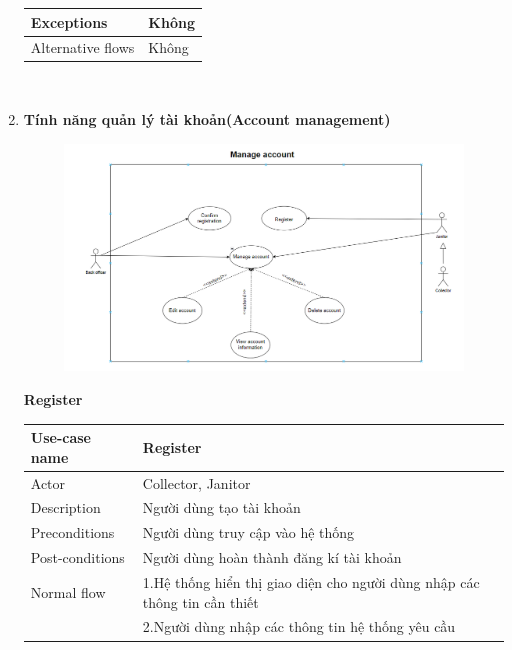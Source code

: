\documentclass[a4paper]{article}
\begin{document}
\begin{enumerate}
\begin{tabular}{| p{3cm} | p{10cm} |}
      \hline
     Exceptions & Không 
     \\ \hline
     Alternative flows & Không
     \\ \hline
\end{tabular}\\
\vspace{0.5cm}


 






\item \textbf{Tính năng quản lý tài khoản(Account management)}
\begin{figure}[!h]
    \begin{center}
      \includegraphics[width=6in]{Image/account.png}
    \end{center}
\end{figure}

\textbf{Register}\\
\begin{tabular}{| p{3cm} | p{10cm} |}
  \hline
     Use-case name & Register
     \\
     \hline
     Actor & Collector, Janitor
     \\ \hline
     Description & Người dùng tạo tài khoản
      \\
     \hline
     Preconditions & Người dùng truy cập vào hệ thống
     \\ \hline
     Post-conditions & Người dùng hoàn thành đăng kí tài khoản
     \\ \hline
      Normal flow & 1.Hệ thống hiển thị giao diện cho người dùng nhập các thông tin cần thiết
      \\
      & 2.Người dùng nhập các thông tin hệ thống yêu cầu  \\


\end{tabular}
\end{enumerate}
\end{document}
